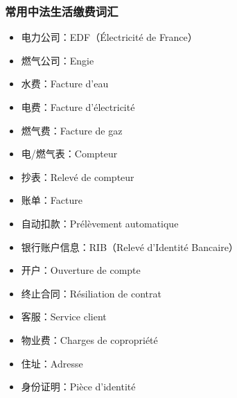 \subsubsection{常用中法生活缴费词汇}
\begin{itemize}
    \item 电力公司：EDF（Électricité de France）
    \item 燃气公司：Engie
    \item 水费：Facture d’eau
    \item 电费：Facture d’électricité
    \item 燃气费：Facture de gaz
    \item 电/燃气表：Compteur
    \item 抄表：Relevé de compteur
    \item 账单：Facture
    \item 自动扣款：Prélèvement automatique
    \item 银行账户信息：RIB（Relevé d’Identité Bancaire）
    \item 开户：Ouverture de compte
    \item 终止合同：Résiliation de contrat
    \item 客服：Service client
    \item 物业费：Charges de copropriété
    \item 住址：Adresse
    \item 身份证明：Pièce d’identité
\end{itemize}
